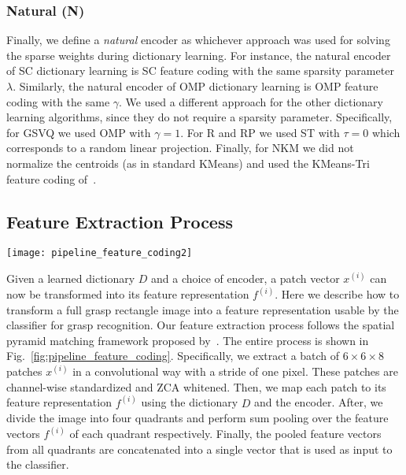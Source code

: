 \documentclass[svgnames]{scrartcl}
\begin{document}
\subsubsection{Natural (N)}

Finally, we define a \textit{natural} encoder as whichever approach was used for solving the sparse weights during dictionary learning. For instance, the natural encoder of SC dictionary learning is SC feature coding with the same sparsity parameter $\lambda$. Similarly, the natural encoder of OMP dictionary learning is OMP feature coding with the same $\gamma$. We used a different approach for the other dictionary learning algorithms, since they do not require a sparsity parameter. Specifically, for GSVQ we used OMP with $\gamma = 1$. For R and RP we used ST with $\tau=0$ which corresponds to a random linear projection. Finally, for NKM we did not normalize the centroids (as in standard KMeans) and used the KMeans-Tri feature coding of~\citet{coates2011analysis}.

\subsection{Feature Extraction Process}
\label{ssec:feature_extraction_process}

\begin{figure*}[t]
\centering
\texttt{[image: pipeline\_feature\_coding2]}
\caption{Feature extraction process. Left: a batch of $6 \times 6 \times 8$ patches $x^{(i)}$ are extracted in a convolutional way (with a stride of one pixel) from the image. The patches are then channel respective standardized and ZCA whitened. Center-Left: each patch $x^{(i)}$ is mapped to its feature representation $f^{(i)}$ given a dictionary $D$ and a choice of encoder. Center-Right: a four quadrants sum pooling is applied on feature vectors $f^{(i)}$. Right: all quadrant pooled weights are concatenated into a single vector. The final vector on the right is used as input to the SVM.}
\label{fig:pipeline_feature_coding}
\end{figure*}

Given a learned dictionary $D$ and a choice of encoder, a patch vector $x^{(i)}$ can now be transformed into its feature representation $f^{(i)}$. Here we describe how to transform a full grasp rectangle image into a feature representation usable by the classifier for grasp recognition. Our feature extraction process follows the spatial pyramid matching framework proposed by~\citet{yang2009linear}. The entire process is shown in Fig.~\ref{fig:pipeline_feature_coding}. Specifically, we extract a batch of $6 \times 6 \times 8$ patches $x^{(i)}$ in a convolutional way with a stride of one pixel. These patches are channel-wise standardized and ZCA whitened. Then, we map each patch to its feature representation $f^{(i)}$ using the dictionary $D$ and the encoder. After, we divide the image into four quadrants and perform sum pooling over the feature vectors $f^{(i)}$ of each quadrant respectively. Finally, the pooled feature vectors from all quadrants are concatenated into a single vector that is used as input to the classifier.
\end{document}
